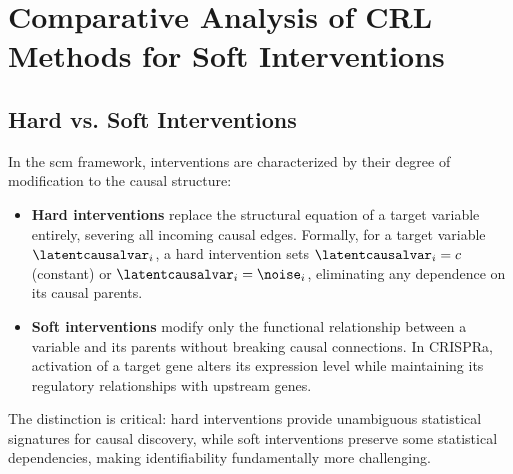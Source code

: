 
\section{Comparative Analysis of CRL Methods for Soft Interventions}
\label{app:crl_methods}

\subsection{Hard vs. Soft Interventions}
\label{app:crl_methods:intervention_types}

In the \gls{scm} framework, interventions are characterized by their degree of
modification to the causal structure:

\begin{itemize}
    \item \textbf{Hard interventions} replace the structural equation of a target
          variable entirely, severing all incoming causal edges. Formally, for a
          target variable $\latentcausalvar_i$, a hard intervention sets
          $\latentcausalvar_i = c$ (constant) or $\latentcausalvar_i = \noise_i$,
          eliminating any dependence on its causal parents.
    \item \textbf{Soft interventions} modify only the functional relationship
          between a variable and its parents without breaking causal connections.
          In CRISPRa, activation of a target gene alters its expression level
          while maintaining its regulatory relationships with upstream genes.
\end{itemize}

The distinction is critical: hard interventions provide unambiguous statistical
signatures for causal discovery, while soft interventions preserve some
statistical dependencies, making identifiability fundamentally more challenging.


